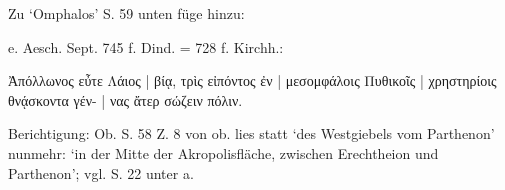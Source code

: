 \documentclass[a4paper, 11pt, oneside]{article}
\begin{document}
Zu `Omphalos' S. 59 unten füge hinzu:

e. Aesch. Sept. 745 f. Dind. = 728 f. Kirchh.:

Ἀπόλλωνος εὖτε Λάιος | βίᾳ, τρὶς εἰπόντος ἐν | μεσομφάλοις Πυθικοῖς | χρηστηρίοις θνᾴσκοντα γέν- | νας ἄτερ σώζειν πόλιν.

Berichtigung: Ob. S. 58 Z. 8 von ob. lies statt `des Westgiebels vom Parthenon' nunmehr: `in der Mitte der Akropolisfläche, zwischen Erechtheion und Parthenon'; vgl. S. 22 unter a.
\end{document}
